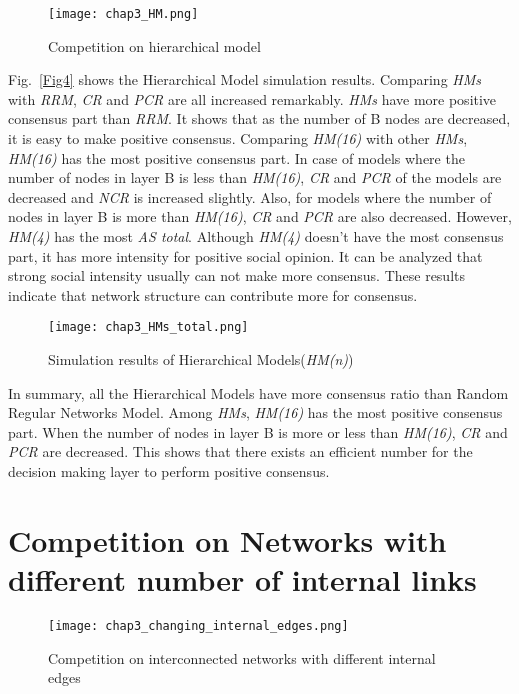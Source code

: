 \begin{figure*}[!htb]
	\centering
	\texttt{[image: chap3\_HM.png]}
	\caption{Competition on hierarchical model}
	\label{chap3_HM}
\end{figure*}

Fig.~\ref{Fig4} shows the Hierarchical Model simulation results. Comparing \textit{HMs} with \textit{RRM}, \textit{CR} and \textit{PCR} are all increased remarkably. \textit{HMs} have more positive consensus part than \textit{RRM}. It shows that as the number of B nodes are decreased, it is easy to make positive consensus. Comparing \textit{HM(16)} with other \textit{HMs}, \textit{HM(16)} has the most positive consensus part. In case of models where the number of nodes in layer B is less than \textit{HM(16)},  \textit{CR} and \textit{PCR} of the models are decreased and \textit{NCR} is increased slightly. Also, for models where the number of nodes in layer B is more than \textit{HM(16)}, \textit{CR} and \textit{PCR} are also decreased. However, \textit{HM(4)} has the most \textit{AS total}. Although \textit{HM(4)} doesn't have the most consensus part, it has more intensity for positive social opinion. It can be analyzed that strong social intensity usually can not make more consensus. These results indicate that network structure can contribute more for consensus. 

\begin{figure}[!htb]
	\centering
	\texttt{[image: chap3\_HMs\_total.png]}
	\caption{Simulation results of Hierarchical Models(\textit{HM(n)})}
	\label{chap3_HMs_total}
\end{figure}

In summary, all the Hierarchical Models have more consensus ratio than Random Regular Networks Model. Among \textit{HMs}, \textit{HM(16)} has the most positive consensus part. When the number of nodes in layer B is more or less than \textit{HM(16)}, \textit{CR} and \textit{PCR} are decreased. This shows that there exists an efficient number for the decision making layer to perform positive consensus.  

\section{Competition on Networks with different number of internal links}

\begin{figure*}[!htb]
	\centering
	\texttt{[image: chap3\_changing\_internal\_edges.png]}
	\caption{Competition on interconnected networks with different internal edges}
	\label{chap3_changing_internal_edges}
\end{figure*}

